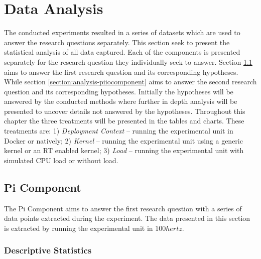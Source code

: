 \iffalse  \fi
\chapter{Data Analysis}\label{section:data-analysis}

The conducted experiments resulted in a series of datasets which are used to answer the research questions separately. This section seek to present the statistical analysis of all data captured. Each of the components is presented separately for the research question they individually seek to answer. Section \ref{section:analysis-picomponent} aims to answer the first research question and its corresponding hypotheses. While section \ref{section:analysis-piiocomponent} aims to answer the second research question and its corresponding hypotheses. Initially the hypotheses will be answered by the conducted methods where further in depth analysis will be presented to uncover details not answered by the hypotheses. Throughout this chapter the three treatments will be presented in the tables and charts. These treatments are: 1) \textit{Deployment Context} – running the experimental unit in Docker or natively; 2) \textit{Kernel} – running the experimental unit using a generic kernel or an RT enabled kernel; 3) \textit{Load} – running the experimental unit with simulated CPU load or without load.


\section{Pi Component}
\label{section:analysis-picomponent}

The Pi Component aims to answer the first research question with a series of data points extracted during the experiment. The data presented in this section is extracted by running the experimental unit in $100hertz$.


\subsection{Descriptive Statistics}
\label{section:analysis-picomponent-desc}

